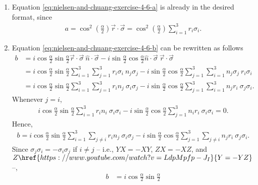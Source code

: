 \begin{enumerate}[label=\alph*)]
    \item Equation \ref{eq:nielsen-and-chuang-exercise-4-6-a} is already
    in the desired format, since
    \begin{align}
        a = \cos^2 \left(\frac{\alpha}{2}\right) \vec{r}\cdot\vec{\sigma} =
        \cos^2 \left(\frac{\alpha}{2}\right) \sum_{i = 1}^3 r_i \sigma_i .
    \end{align}
    \item Equation \ref{eq:nielsen-and-chuang-exercise-4-6-b} can be
    rewritten as follows
    \begin{align}
        b &= i \cos\frac{\alpha}{2}\sin\frac{\alpha}{2} \vec{r} \cdot\vec{\sigma}
            \ \hat{n}\cdot\vec{\sigma} -
            i \sin\frac{\alpha}{2}\cos\frac{\alpha}{2} \hat{n}\cdot\vec{\sigma}
            \ \vec{r}\cdot\vec{\sigma} \\
        &= i \cos\frac{\alpha}{2}\sin\frac{\alpha}{2}
            \sum_{i = 1}^3 \sum_{j = 1}^3 r_i \sigma_i\ n_j \sigma_j
            -
            i \sin\frac{\alpha}{2}\cos\frac{\alpha}{2}
            \sum_{j = 1}^3\sum_{i = 1}^3 n_j \sigma_j\ r_i \sigma_i \\
        &= i \cos\frac{\alpha}{2}\sin\frac{\alpha}{2}
            \sum_{i = 1}^3 \sum_{j = 1}^3 r_i n_j\ \sigma_i \sigma_j
            -
            i \sin\frac{\alpha}{2}\cos\frac{\alpha}{2}
            \sum_{j = 1}^3\sum_{i = 1}^3 n_j r_i\ \sigma_j \sigma_i.
    \end{align}
    Whenever $j = i$,
    \begin{align}
        i \cos\frac{\alpha}{2}\sin\frac{\alpha}{2}
        \sum_{i = 1}^3 r_i n_i\ \sigma_i \sigma_i
        -
        i \sin\frac{\alpha}{2}\cos\frac{\alpha}{2}
        \sum_{j = 1}^3 n_i r_i\ \sigma_i \sigma_i
        = 0.
    \end{align}
    Hence,
    \begin{align}
        b = i \cos\frac{\alpha}{2}\sin\frac{\alpha}{2}
            \sum_{i = 1}^3 \sum_{j \neq i} r_i n_j\ \sigma_i \sigma_j
            -
            i \sin\frac{\alpha}{2}\cos\frac{\alpha}{2}
            \sum_{j = 1}^3\sum_{j \neq i} n_j r_i\ \sigma_j \sigma_i .
    \end{align}
    Since $\sigma_j\sigma_i = - \sigma_i \sigma_j$ if $i \neq j$ -- i.e.,
    $YX = -XY$, $ZX = -XZ$, and
    $Z\href{https://www.youtube.com/watch?v=LdpMpfp-J_I}{Y = -YZ}$ --,
    \begin{align}
        b &= i \cos\frac{\alpha}{2}\sin\frac{\alpha}{2}

\end{align}
\end{enumerate}
